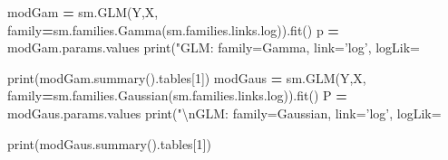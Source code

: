 \documentclass[polish,]{book}
\newenvironment{Shaded}{\begin{snugshade}}{\end{snugshade}}
\newcommand{\BuiltInTok}[1]{#1}
\newcommand{\CharTok}[1]{\textcolor[rgb]{0.31,0.60,0.02}{#1}}
\newcommand{\DecValTok}[1]{\textcolor[rgb]{0.00,0.00,0.81}{#1}}
\newcommand{\NormalTok}[1]{#1}
\newcommand{\OperatorTok}[1]{\textcolor[rgb]{0.81,0.36,0.00}{\textbf{#1}}}
\newcommand{\SpecialCharTok}[1]{\textcolor[rgb]{0.00,0.00,0.00}{#1}}
\newcommand{\StringTok}[1]{\textcolor[rgb]{0.31,0.60,0.02}{#1}}
\begin{document}
\begin{Shaded}
\begin{Highlighting}[]
\NormalTok{modGam }\OperatorTok{=}\NormalTok{ sm.GLM(Y,X, family}\OperatorTok{=}\NormalTok{sm.families.Gamma(sm.families.links.log)).fit()}
\NormalTok{p }\OperatorTok{=}\NormalTok{ modGam.params.values}
\BuiltInTok{print}\NormalTok{(}\StringTok{"GLM: family=Gamma, link='log', logLik= }\SpecialCharTok{%
\BuiltInTok{print}\NormalTok{(modGam.summary().tables[}\DecValTok{1}\NormalTok{])}
\NormalTok{modGaus }\OperatorTok{=}\NormalTok{ sm.GLM(Y,X, family}\OperatorTok{=}\NormalTok{sm.families.Gaussian(sm.families.links.log)).fit()}
\NormalTok{P }\OperatorTok{=}\NormalTok{ modGaus.params.values}
\BuiltInTok{print}\NormalTok{(}\StringTok{"}\CharTok{\textbackslash{}n}\StringTok{GLM: family=Gaussian, link='log', logLik= }\SpecialCharTok{%
\BuiltInTok{print}\NormalTok{(modGaus.summary().tables[}\DecValTok{1}\NormalTok{])}

}}
\end{Highlighting}
\end{Shaded}
\end{document}
